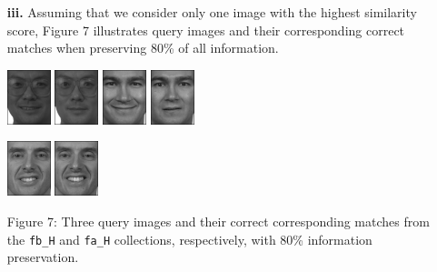 \documentclass[ 12pt ]{article}
\begin{document}
\begin{enumerate}
\begin{enumerate}
            \item[\textbf{iii.}] Assuming that we consider only one image with the highest similarity score, Figure 7 illustrates query images and their corresponding correct matches
                when preserving 80\% of all information.
                \begin{center}
                    \includegraphics[scale=1.7]{f_h_images/AnyConv.com__00182_940422_fb_a}
                    \includegraphics[scale=1.7]{f_h_images/AnyConv.com__00182_940422_fa_a}
                    \includegraphics[scale=1.7]{f_h_images/AnyConv.com__00753_941201_fb}
                    \includegraphics[scale=1.7]{f_h_images/AnyConv.com__00753_941201_fa}
                \end{center}
                \begin{center}
                    \includegraphics[scale=1.7]{f_h_images/AnyConv.com__00501_940519_fb}
                    \includegraphics[scale=1.7]{f_h_images/AnyConv.com__00501_940519_fa}
                \end{center}
                \begin{center}
                    \scriptsize
                    Figure 7: Three query images and their correct corresponding matches from the \verb|fb_H| and \verb|fa_H| collections, respectively, with 80\%
                    information preservation.
                \end{center}


\end{enumerate}
\end{enumerate}
\end{document}
